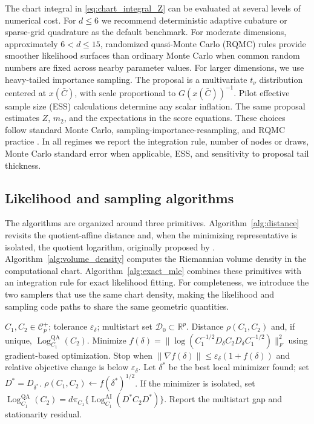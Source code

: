 \documentclass[
  12pt]{article}
\newcommand{\Corr}{\mathcal C^+}
\newcommand{\Log}{\operatorname{Log}}
\newcommand{\R}{\mathbb R}
\newcommand{\QA}{\mathrm{QA}}
\newcommand{\AI}{\mathrm{AI}}
\begin{document}
The chart integral in \eqref{eq:chart_integral_Z} can be evaluated at several levels of numerical cost. For $d\le6$ we recommend deterministic adaptive cubature or sparse-grid quadrature as the default benchmark. For moderate dimensions, approximately $6<d\le15$, randomized quasi-Monte Carlo (RQMC) rules provide smoother likelihood surfaces than ordinary Monte Carlo when common random numbers are fixed across nearby parameter values. For larger dimensions, we use heavy-tailed importance sampling. The proposal is a multivariate $t_\nu$ distribution centered at $x(\bar C)$, with scale proportional to $G(x(\bar C))^{-1}$. Pilot effective sample size (ESS) calculations determine any scalar inflation. The same proposal estimates $Z$, $m_2$, and the expectations in the score equations. These choices follow standard Monte Carlo, sampling-importance-resampling, and RQMC practice \citep{robert_1999_MonteCarloStatistical, rubin_1988_UsingSIRAlgorithm, smith_1992_BayesianStatisticsTears}. In all regimes we report the integration rule, number of nodes or draws, Monte Carlo standard error when applicable, ESS, and sensitivity to proposal tail thickness.



\subsection{Likelihood and sampling algorithms}\label{sec:algorithms}

The algorithms are organized around three primitives. Algorithm~\ref{alg:distance} revisits the quotient-affine distance and, when the minimizing representative is isolated, the quotient logarithm, originally proposed by \citet{david_2019_RiemannianStructureCorrelation}. Algorithm~\ref{alg:volume_density} computes the Riemannian volume density in the computational chart. Algorithm~\ref{alg:exact_mle} combines these primitives with an integration rule for exact likelihood fitting. For completeness, we introduce the two samplers that use the same chart density, making the likelihood and sampling code paths to share the same geometric quantities.

\begin{algorithm}[ht]
\caption{Quotient-affine distance and logarithm}
\label{alg:distance}
\begin{algorithmic}[1]
\Require $C_1,C_2\in\Corr_p$; tolerance $\varepsilon_{\delta}$; multistart set $\mathcal D_0\subset\R^p$.
\Ensure Distance $\rho(C_1,C_2)$ and, if unique, $\Log^{\QA}_{C_1}(C_2)$.
    \State Minimize $f(\delta)=\|\log(C_1^{-1/2}D_{\delta}C_2D_{\delta}C_1^{-1/2})\|_F^2$ using gradient-based optimization.
    \State Stop when $\|\nabla f(\delta)\|\le\varepsilon_{\delta}(1+f(\delta))$ and relative objective change is below $\varepsilon_{\delta}$.
\EndFor
\State Let $\delta^*$ be the best local minimizer found; set $D^*=D_{\delta^*}$.
\State $\rho(C_1,C_2)\leftarrow f(\delta^*)^{1/2}$.
\State If the minimizer is isolated, set $\Log^{\QA}_{C_1}(C_2)=d\pi_{C_1}\{\Log^{\AI}_{C_1}(D^*C_2D^*)\}$.
\State Report the multistart gap and stationarity residual.
\end{algorithmic}
\end{algorithm}
\end{document}
